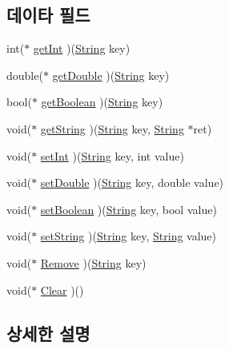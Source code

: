 \subsection*{데이타 필드}
\begin{DoxyCompactItemize}
\item 
int($\ast$ \hyperlink{struct___preference_ade99d80ce928102448db06db94ab9f92}{get\-Int} )(\hyperlink{dit_8h_a2efe6d463d80744789f228f5dc4baa39}{String} key)
\item 
double($\ast$ \hyperlink{struct___preference_afe52eabc9bccdfbb596972f7ea486ead}{get\-Double} )(\hyperlink{dit_8h_a2efe6d463d80744789f228f5dc4baa39}{String} key)
\item 
bool($\ast$ \hyperlink{struct___preference_a4be87827f55abdbd3012520159040082}{get\-Boolean} )(\hyperlink{dit_8h_a2efe6d463d80744789f228f5dc4baa39}{String} key)
\item 
void($\ast$ \hyperlink{struct___preference_adb1c477dbd0c3e00ee2ba27168145ac1}{get\-String} )(\hyperlink{dit_8h_a2efe6d463d80744789f228f5dc4baa39}{String} key, \hyperlink{dit_8h_a2efe6d463d80744789f228f5dc4baa39}{String} $\ast$ret)
\item 
void($\ast$ \hyperlink{struct___preference_aa764bbce5aed489d6d513185620475e3}{set\-Int} )(\hyperlink{dit_8h_a2efe6d463d80744789f228f5dc4baa39}{String} key, int value)
\item 
void($\ast$ \hyperlink{struct___preference_a254206bd3d65b6005aa12230f4297321}{set\-Double} )(\hyperlink{dit_8h_a2efe6d463d80744789f228f5dc4baa39}{String} key, double value)
\item 
void($\ast$ \hyperlink{struct___preference_a7a60c27995791a32705d277621ce9d4b}{set\-Boolean} )(\hyperlink{dit_8h_a2efe6d463d80744789f228f5dc4baa39}{String} key, bool value)
\item 
void($\ast$ \hyperlink{struct___preference_a0335e1a950110bafc47fab3849396e74}{set\-String} )(\hyperlink{dit_8h_a2efe6d463d80744789f228f5dc4baa39}{String} key, \hyperlink{dit_8h_a2efe6d463d80744789f228f5dc4baa39}{String} value)
\item 
void($\ast$ \hyperlink{struct___preference_a90568077b029ed3e0b1602de2448ace5}{Remove} )(\hyperlink{dit_8h_a2efe6d463d80744789f228f5dc4baa39}{String} key)
\item 
void($\ast$ \hyperlink{struct___preference_a38ab41f7f71a3a7e6ae756e158bb812c}{Clear} )()
\end{DoxyCompactItemize}


\subsection{상세한 설명}


